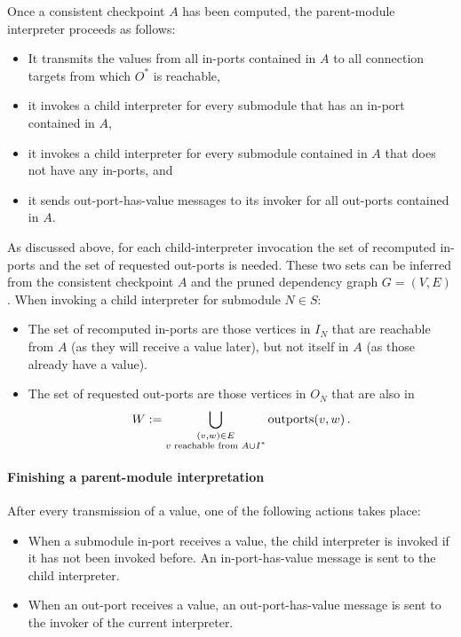 \documentclass[paper=letter,fontsize=11pt,captions=tableheading]{scrartcl}
\numberwithin{equation}{section}
\newcommand{\SiM}{\mathchoice{\,}{}{}{}}
\theoremstyle{algorithm}
\theoremstyle{plain}
\theoremstyle{nonumberplain}
\begin{document}
Once a consistent checkpoint $A$ has been computed, the parent-module interpreter proceeds as follows:
\begin{itemize}
	\item It transmits the values from all in-ports contained in $A$ to all connection targets from which $O^*$ is reachable,
	\item it invokes a child interpreter for every submodule that has an in-port contained in $A$,
	\item it invokes a child interpreter for every submodule contained in $A$ that does not have any in-ports, and
	\item it sends out-port-has-value messages to its invoker for all out-ports contained in $A$.
\end{itemize}
%
As discussed above, for each child-interpreter invocation the set of recomputed in-ports and the set of requested out-ports is needed. These two sets can be inferred from the consistent checkpoint $A$ and the pruned dependency graph $G = (V,E)$. When invoking a child interpreter for submodule $N \in S$:
\begin{itemize}
	\item The set of recomputed in-ports are those vertices in $I_N$ that are reachable from $A$ (as they will receive a value later), but not itself in $A$ (as those already have a value).
	\item The set of requested out-ports are those vertices in $O_N$ that are also in
        \begin{gather}
        	W := \bigcup_{\substack{(v,w) \in E\\v \text{ reachable from } A \cup I^*}} \outports(v, w)\SiM. \label{eq:W}
        \end{gather}
\end{itemize}

\paragraph{Finishing a parent-module interpretation}

After every transmission of a value, one of the following actions takes place:
\begin{itemize}
	\item When a submodule in-port receives a value, the child interpreter is invoked if it has not been invoked before. An in-port-has-value message is sent to the child interpreter.
	\item When an out-port receives a value, an out-port-has-value message is sent to the invoker of the current interpreter.
\end{itemize}
\end{document}
